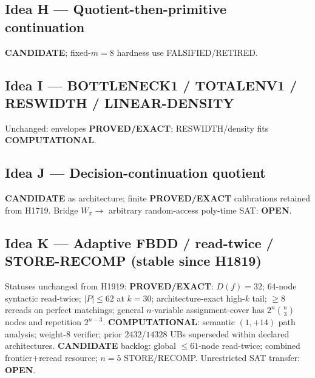 \documentclass[11pt]{article}
\begin{document}
\subsection*{Idea H --- Quotient-then-primitive continuation}
\textbf{CANDIDATE}; fixed-$m=8$ hardness use FALSIFIED/RETIRED.

\subsection*{Idea I --- BOTTLENECK1 / TOTALENV1 / RESWIDTH / LINEAR-DENSITY}
Unchanged: envelopes \textbf{PROVED/EXACT}; RESWIDTH/density fits \textbf{COMPUTATIONAL}.

\subsection*{Idea J --- Decision-continuation quotient}
\textbf{CANDIDATE} as architecture; finite \textbf{PROVED/EXACT} calibrations retained from H1719.
Bridge $W_\pi\to$ arbitrary random-access poly-time SAT: \textbf{OPEN}.

\subsection*{Idea K --- Adaptive FBDD / read-twice / STORE-RECOMP (stable since H1819)}
Statuses unchanged from H1919:
\textbf{PROVED/EXACT}: $D(f)=32$; $64$-node syntactic read-twice; $|P|\le62$ at $k=30$;
architecture-exact high-$k$ tail; $\ge8$ rereads on perfect matchings; general
$n$-variable assignment-cover has $2^n\binom{n}{3}$ nodes and repetition $2^{n-3}$.
\textbf{COMPUTATIONAL}: semantic $(1,+14)$ path analysis; weight-$8$ verifier;
prior $2432$/$14328$ UBs superseded within declared architectures.
\textbf{CANDIDATE} backlog: global $\le61$-node read-twice; combined frontier$+$reread resource;
$n=5$ STORE/RECOMP.
Unrestricted SAT transfer: \textbf{OPEN}.
\end{document}
